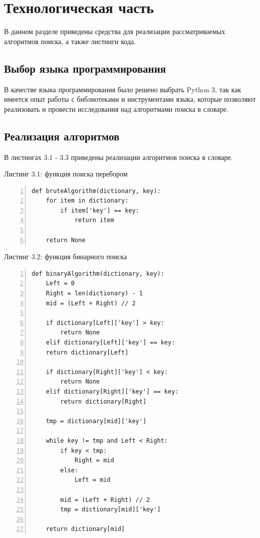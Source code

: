 \documentclass[12pt,a4paper]{report}
\begin{document}
\newpage
\chapter{Технологическая часть} 

В данном разделе приведены средства для реализации рассматриваемых алгоритмов поиска, а также 
листинги кода.

\section{Выбор языка программирования}

В качестве языка программирования было решено выбрать Python 3, так как имеется опыт работы с библиотеками и 
инструментами языка, которые позволяют реализовать и провести исследования над алгоритмами поиска в словаре.

\section{Реализация алгоритмов}

В листингах 3.1 - 3.3 приведены реализации алгоритмов поиска в словаре.

\textrm{Листинг 3.1: функция поиска перебором}
\begin{lstlisting}[frame=single, numbers=left]
def bruteAlgorithm(dictionary, key):
    for item in dictionary:
        if item['key'] == key:
            return item

    return None
\end{lstlisting}

\textrm{Листинг 3.2: функция бинарного поиска}
\begin{lstlisting}[frame=single, numbers=left]
def binaryAlgorithm(dictionary, key):
    Left = 0
    Right = len(dictionary) - 1
    mid = (Left + Right) // 2

    if dictionary[Left]['key'] > key:
        return None
    elif dictionary[Left]['key'] == key:
    return dictionary[Left]

    if dictionary[Right]['key'] < key:
        return None
    elif dictionary[Right]['key'] == key:
        return dictionary[Right] 

    tmp = dictionary[mid]['key']

    while key != tmp and Left < Right:
        if key < tmp:
            Right = mid
        else:
            Left = mid

        mid = (Left + Right) // 2
        tmp = dictionary[mid]['key']
        
    return dictionary[mid]
\end{lstlisting}
\end{document}
